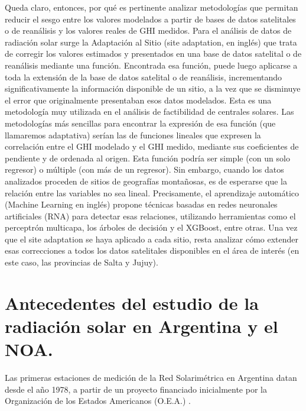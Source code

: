 \documentclass[letterpaper,12pt, twoside]{report}
\providecommand{\DIFdeltex}[1]{{\protect\color{red} \scriptsize #1}} %
\providecommand{\DIFdel}[1]{\texorpdfstring{\DIFdeltex{#1}}{}} %
\begin{document}
\DIFdel{Queda claro, entonces, por qué es pertinente analizar metodologías que permitan reducir el sesgo entre los valores modelados a partir de bases de datos satelitales o de reanálisis y los valores reales de GHI medidos. Para el análisis de datos de radiación solar surge la Adaptación al Sitio (site adaptation, en inglés) que trata de corregir los valores estimados y presentados en una base de datos satelital o de reanálisis mediante una función. Encontrada esa función, puede luego aplicarse a toda la extensión de la base de datos satelital o de reanálisis, incrementando significativamente la información disponible de un sitio, a la vez que se disminuye el error que originalmente presentaban esos datos modelados. Esta es una metodología muy utilizada en el análisis de factibilidad de centrales solares.
Las metodologías más sencillas para encontrar la expresión de esa función (que llamaremos adaptativa) serían las de funciones lineales que expresen la correlación entre el GHI modelado y el GHI medido, mediante sus coeficientes de pendiente y de ordenada al origen. Esta función podría ser simple (con un solo regresor) o múltiple (con más de un regresor). Sin embargo, cuando los datos analizados proceden de sitios de geografías montañosas, es de esperarse que la relación entre las variables no sea lineal.
Precisamente, el aprendizaje automático (Machine Learning en inglés) propone técnicas basadas en redes neuronales artificiales (RNA) para detectar esas relaciones, utilizando herramientas como el perceptrón multicapa, los árboles de decisión y el XGBoost, entre otras. 
Una vez que el site adaptation se haya aplicado a cada sitio, resta analizar cómo extender esas correcciones a todos los datos satelitales disponibles en el área de interés (en este caso, las provincias de Salta y Jujuy).
}%

\section{\DIFdel{Antecedentes del estudio de la radiación solar en Argentina y el NOA.}}
\addtocounter{section}{-1}%

\DIFdel{Las primeras estaciones de medición de la Red Solarimétrica en Argentina datan desde el año 1978, a partir de un proyecto financiado inicialmente por la Organización de los Estados Americanos (O.E.A.) \citep{GrossiGallegos1999}.
}%
\end{document}
